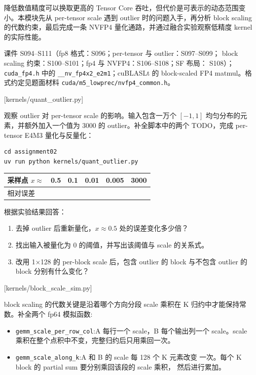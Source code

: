 \documentclass[11pt,a4paper,fontset=fandol]{ctexart}
\providecommand{\tightlist}{\setlength{\itemsep}{0pt}\setlength{\parskip}{0pt}}
\begin{document}
降低数值精度可以换取更高的 Tensor Core
吞吐，但代价是可表示的动态范围变小。本模块先从 per-tensor scale 遇到
outlier 时的问题入手，再分析 block scaling 的代数约束，最后完成一条
NVFP4 量化通路，并通过融合实验观察低精度 kernel 的实际性能。

\begin{reading}

课件 S094--S111（fp8 格式：S096；per-tensor 与 outlier：S097--S099；
block scaling 约束：S100--S101；fp4 与 NVFP4：S106--S108；SF 布局：
S108）；\texttt{cuda\_fp4.h} 中的 \texttt{\_\_nv\_fp4x2\_e2m1}；cuBLASLt
的 block-scaled FP4 matmul。格式约定见题面材料
\texttt{cuda/m5\_lowprec/nvfp4\_common.h}。

\end{reading}

[kernels/quant\_outlier.py]

观察 outlier 对 per-tensor scale 的影响。输入包含一万个 \([-1,1]\)
均匀分布的元素，并额外加入一个值为 3000 的 outlier。补全脚本中的两个
TODO，完成 per-tensor E4M3 量化与反量化：

\begin{verbatim}
cd assignment02
uv run python kernels/quant_outlier.py
\end{verbatim}

\begin{longtable}[]{@{}llllll@{}}
\toprule\noalign{}
采样点 \(x\approx\) & 0.5 & 0.1 & 0.01 & 0.005 & 3000 \\
\midrule\noalign{}
\endhead
\bottomrule\noalign{}
\endlastfoot
相对误差 & & & & & \\
\end{longtable}

根据实验结果回答：

\begin{enumerate}
\def\labelenumi{(\alph{enumi})}
\item
  去掉 outlier 后重新量化，\(x\approx0.5\) 处的误差变化多少倍？
\item
  找出输入被量化为 0 的阈值，并写出该阈值与 scale 的关系式。
\item
  改用 1×128 的 per-block scale 后，包含 outlier 的 block 与不包含
  outlier 的 block 分别有什么变化？
\end{enumerate}

[kernels/block\_scale\_sim.py]

block scaling 的代数关键是沿着哪个方向分段 scale 乘积在 K
归约中才能保持常数。补全两个 fp64 模拟函数:

\begin{itemize}
\tightlist
\item
  \texttt{gemm\_scale\_per\_row\_col}:A 每行一个 scale，B 每个输出列一个
  scale。scale 乘积在整个点积中不变，完整归约后只用乘回一次。
\item
  \texttt{gemm\_scale\_along\_k}:A 和 B 的 scale 每 128 个 K 元素改变
  一次。每个 K block 的 partial sum 要分别乘回该段的 scale 乘积，
  然后进行累加。
\end{itemize}
\end{document}
